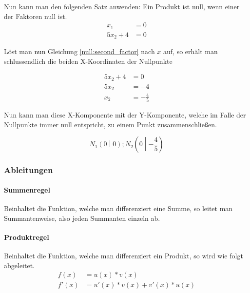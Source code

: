 \documentclass[a4paper]{article}
\begin{document}
				Nun kann man den folgenden Satz anwenden: Ein Produkt ist null, wenn einer der Faktoren null ist.\\
				
				\begin{align}
					x_1 &= 0\\
					5x_2 + 4 &= 0 \label{null:second_factor}
				\end{align}
				
				Löst man nun Gleichung \ref{null:second_factor} nach $x$ auf, so erhält man schlussendlich die beiden X-Koordinaten der Nullpunkte
				
				\begin{equation}
					\begin{split}
						5x_2 + 4 &= 0\\
						5x_2 &= -4\\
						x_2 &= -\frac{4}{5}
					\end{split}
				\end{equation}
				
				\noindent
				Nun kann man diese X-Komponente mit der Y-Komponente, welche im Falle der Nullpunkte immer null entspricht, zu einem Punkt zusammenschließen.
				
				\begin{equation}
					N_1\left(0\middle|0\right); 
					N_2\left(0\middle|-\frac{4}{5}\right)
				\end{equation}
				
			\subsubsection{Ableitungen}
				\paragraph{Summenregel}
					Beinhaltet die Funktion, welche man differenziert eine Summe, so leitet man Summantenweise, also jeden Summanten einzeln ab.
				
				\paragraph{Produktregel}
					Beinhaltet die Funktion, welche man differenziert ein Produkt, so wird wie folgt abgeleitet.
					\begin{subequations}
						\begin{align}
							f(x) &= u(x) * v(x)\\
							f'(x) &= u'(x) * v(x) + v'(x) * u(x)
						\end{align}
					\end{subequations}
					
\end{document}
